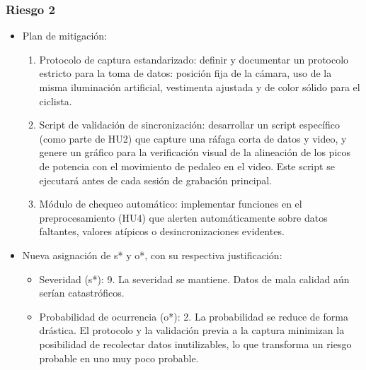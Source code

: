\documentclass[
11pt, %
]{charter}
\begin{document}
\subsubsection*{Riesgo 2}
\begin{itemize}
    \item Plan de mitigación:
    \begin{enumerate}
        \item Protocolo de captura estandarizado: definir y documentar un protocolo estricto para la toma de datos: posición fija de la cámara, uso de la misma iluminación artificial, vestimenta ajustada y de color sólido para el ciclista.
        \item Script de validación de sincronización: desarrollar un script específico (como parte de HU2) que capture una ráfaga corta de datos y video, y genere un gráfico para la verificación visual de la alineación de los picos de potencia con el movimiento de pedaleo en el video. Este script se ejecutará antes de cada sesión de grabación principal.
        \item Módulo de chequeo automático: implementar funciones en el preprocesamiento (HU4) que alerten automáticamente sobre datos faltantes, valores atípicos o desincronizaciones evidentes.
    \end{enumerate}
    \item Nueva asignación de s* y o*, con su respectiva justificación:
    \begin{itemize}
        \item Severidad (s*): 9. La severidad se mantiene. Datos de mala calidad aún serían catastróficos.
        \item Probabilidad de ocurrencia (o*): 2. La probabilidad se reduce de forma drástica. El protocolo y la validación previa a la captura minimizan la posibilidad de recolectar datos inutilizables, lo que transforma un riesgo probable en uno muy poco probable.
    \end{itemize}
\end{itemize}
\end{document}
